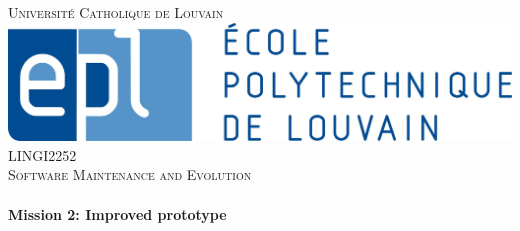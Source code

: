     \begin{titlepage}
        \center %


        \textsc{\LARGE Université Catholique de Louvain }\\[0.8cm] %
        \includegraphics[scale=0.45]{epl.jpg}
        \\[1.5cm]
        \textsc{\Large LINGI2252}\\[0.5cm] %
        \textsc{\large Software Maintenance and Evolution}\\[0.8cm] %


        \HRule \\[0.4cm]
        { \huge \bfseries Mission 2: Improved prototype}\\[0.2cm] %
        \HRule \\[1.5cm]



\end{titlepage}
